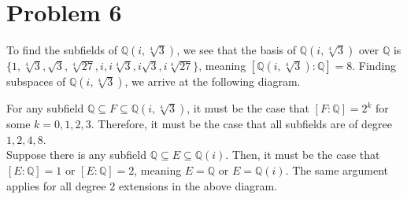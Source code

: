 \documentclass[11pt]{extarticle}
\newcommand{\Q}{\mathbb{Q}}
\begin{document}
  \section{Problem 6}%
  To find the subfields of $\Q(i,\sqrt[4]{3})$, we see that the basis of $\Q(i,\sqrt[4]{3})$ over $\Q$ is $\{1,\sqrt[4]{3},\sqrt{3},\sqrt[4]{27},i,i\sqrt[4]{3},i\sqrt{3},i\sqrt[4]{27}\}$, meaning $[\Q(i,\sqrt[4]{3}):\Q] = 8$. Finding subspaces of $\Q(i,\sqrt[4]{3})$, we arrive at the following diagram.
  \begin{center}
  \end{center}
  For any subfield $\Q\subseteq F \subseteq \Q(i,\sqrt[4]{3})$, it must be the case that $[F:\Q] = 2^k$ for some $k = 0,1,2,3$. Therefore, it must be the case that all subfields are of degree $1,2,4,8$.\\

  Suppose there is any subfield $\Q\subseteq E\subseteq \Q(i)$. Then, it must be the case that $[E:\Q] = 1$ or $[E:\Q] = 2$, meaning $E = \Q$ or $E = \Q(i)$. The same argument applies for all degree $2$ extensions in the above diagram. 
\end{document}
